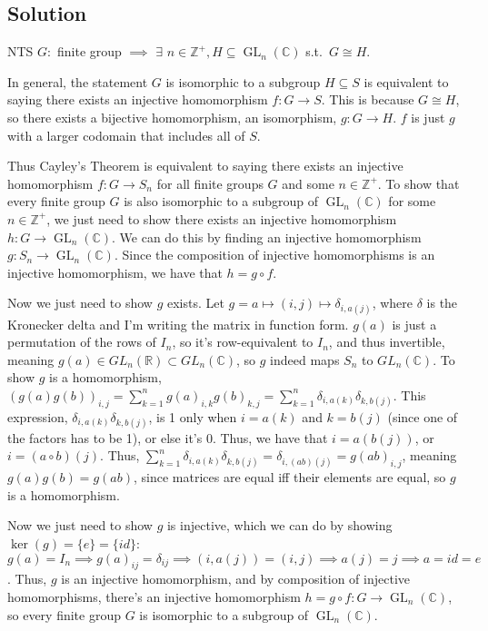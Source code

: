 \documentclass[fleqn]{article}
\DeclareMathOperator{\GL}{GL}
\begin{document}
        \subsection{Solution}
        NTS $G:$ finite group $\implies$ $\exists$ $n \in \mathbb{Z}^+, H \subseteq \GL_n(\mathbb{C})$ s.t.\ $G \cong H$.
        
        In general, the statement $G$ is isomorphic to a subgroup $H \subseteq S$ is equivalent to saying there exists an injective homomorphism $f: G \to S$.  This is because $G \cong H$, so there exists a bijective homomorphism, an isomorphism, $g: G \to H$.  $f$ is just $g$ with a larger codomain that includes all of $S$.
        
        Thus Cayley's Theorem is equivalent to saying there exists an injective homomorphism $f: G \to S_n$ for all finite groups $G$ and some $n \in \mathbb{Z}^+$.  To show that every finite group $G$ is also isomorphic to a subgroup of $\GL_n(\mathbb{C})$ for some $n \in \mathbb{Z}^+$, we just need to show there exists an injective homomorphism $h: G \to \GL_n(\mathbb{C})$.  We can do this by finding an injective homomorphism $g: S_n \to \GL_n(\mathbb{C})$.  Since the composition of injective homomorphisms is an injective homomorphism, we have that $h = g \circ f$.
        
        Now we just need to show $g$ exists.  Let $g = a \mapsto (i, j) \mapsto \delta_{i, a(j)}$, where $\delta$ is the Kronecker delta and I'm writing the matrix in function form.  $g(a)$ is just a permutation of the rows of $I_n$, so it's row-equivalent to $I_n$, and thus invertible, meaning $g(a) \in GL_n(\mathbb{R}) \subset GL_n(\mathbb{C})$, so $g$ indeed maps $S_n$ to $GL_n(\mathbb{C})$.  To show $g$ is a homomorphism, $(g(a)g(b))_{i, j} = \sum\limits_{k = 1}^n g(a)_{i, k} g(b)_{k, j} = \sum\limits_{k = 1}^n \delta_{i, a(k)} \delta_{k, b(j)}$.  This expression, $\delta_{i, a(k)} \delta_{k, b(j)}$, is 1 only when $i = a(k)$ and $k = b(j)$ (since one of the factors has to be 1), or else it's 0.  Thus, we have that $i = a(b(j))$, or $i = (a \circ b)(j)$.  Thus, $\sum\limits_{k = 1}^n \delta_{i, a(k)} \delta_{k, b(j)} = \delta_{i, (ab)(j)} = g(ab)_{i, j}$, meaning $g(a)g(b) = g(ab)$, since matrices are equal iff their elements are equal, so $g$ is a homomorphism.
        
        Now we just need to show $g$ is injective, which we can do by showing $\ker(g) = \{e\} = \{id\}$: $g(a) = I_n \implies g(a)_{ij} = \delta_{ij} \implies (i, a(j)) = (i, j) \implies a(j) = j \implies a = id = e$.  Thus, $g$ is an injective homomorphism, and by composition of injective homomorphisms, there's an injective homomorphism $h = g \circ f: G \to \GL_n(\mathbb{C})$, so every finite group $G$ is isomorphic to a subgroup of $\GL_n(\mathbb{C})$.
    
\end{document}
